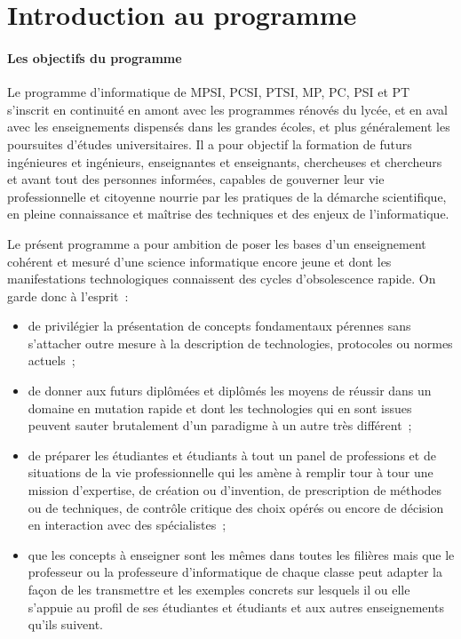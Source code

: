 \section*{Introduction au programme}

\paragraph{Les objectifs du programme} Le programme d’informatique de MPSI, PCSI, PTSI, MP, PC, PSI et PT s’inscrit en continuité en amont avec les programmes rénovés du lycée, et en aval avec les enseignements dispensés dans les grandes écoles, et plus généralement les poursuites d’études universitaires. Il a pour objectif la formation de futurs ingénieures et ingénieurs, enseignantes et enseignants, chercheuses et chercheurs et avant tout des personnes informées, capables 
de gouverner leur vie professionnelle et citoyenne nourrie par les pratiques de la démarche scientifique, en pleine connaissance et maîtrise des techniques et des enjeux de l'informatique.

Le présent programme a pour ambition de poser les bases d'un enseignement cohérent et mesuré d'une science informatique encore jeune et dont les manifestations technologiques connaissent des cycles d'obsolescence rapide. On garde donc à l'esprit~: %
\begin{itemize}
\item de privilégier la présentation de concepts fondamentaux pérennes sans s’attacher outre mesure à la description de technologies, protocoles ou normes actuels~;
\item de donner aux futurs diplômées et diplômés les moyens de réussir dans un domaine en mutation rapide et dont les technologies qui en sont issues peuvent sauter brutalement d'un paradigme à un autre très différent~;
\item de préparer les étudiantes et étudiants à tout un panel de professions et de situations 
de la vie professionnelle qui les amène à remplir tour à tour une mission d'expertise, de création ou d'invention, de prescription de méthodes ou de techniques, de contrôle critique des choix opérés ou encore de décision en interaction avec des spécialistes~;
\item que les concepts à enseigner sont les mêmes dans toutes les filières mais que le professeur ou la professeure d'informatique de chaque classe peut adapter la façon de les transmettre et les exemples concrets sur lesquels il ou elle s'appuie au profil de ses étudiantes et étudiants et aux autres enseignements qu'ils suivent.
\end{itemize}



